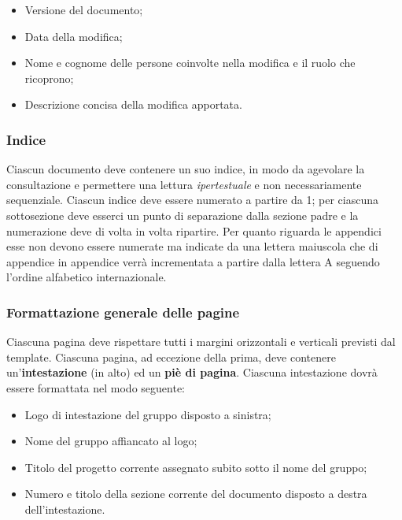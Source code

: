 	\begin{itemize}
	
		\item Versione del documento;
		\item Data della modifica;
		\item Nome e cognome delle persone coinvolte nella modifica e il ruolo che ricoprono;
		\item Descrizione concisa della modifica apportata.
	
	\end{itemize}
	
	\subsubsection{Indice}
	
	Ciascun documento deve contenere un suo indice, in modo da agevolare la consultazione e permettere una lettura \textit{ipertestuale} e non necessariamente sequenziale. Ciascun indice deve essere numerato a partire da 1; per ciascuna sottosezione deve esserci un punto di separazione dalla sezione padre e la numerazione deve di volta in volta ripartire. Per quanto riguarda le appendici esse non devono essere numerate ma indicate da una lettera maiuscola che di appendice in appendice verrà incrementata a partire dalla lettera A seguendo l'ordine alfabetico internazionale.
	
	\subsubsection{Formattazione generale delle pagine}
	
	Ciascuna pagina deve rispettare tutti i margini orizzontali e verticali previsti dal template. Ciascuna pagina, ad eccezione della prima, deve contenere un'\textbf{intestazione} (in alto) ed un \textbf{piè di pagina}. Ciascuna intestazione dovrà essere formattata nel modo seguente:

	\begin{itemize}
	
		\item Logo di intestazione del gruppo disposto a sinistra;
		\item Nome del gruppo affiancato al logo;
		\item Titolo del progetto corrente assegnato subito sotto il nome del gruppo;
		\item Numero e titolo della sezione corrente del documento disposto a destra dell'intestazione.
	
	\end{itemize}
	
